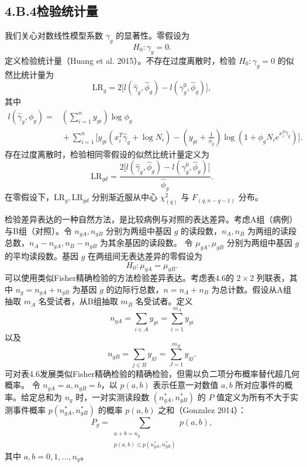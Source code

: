 \subsection*{4.B.4\quad 检验统计量}

我们关心对数线性模型系数 $\gamma_g$ 的显著性。零假设为
\[
H_0:\gamma_g=0.
\]
定义检验统计量（Huang et al. 2015）。不存在过度离散时，检验 $H_0:\gamma_g=0$ 的似然比统计量为
\begin{equation}
\mathrm{LR}_g=2\bigl[l(\widehat\gamma_g,\widehat\phi_g)
-l(\gamma_g^0,\widehat\phi_g)\bigr],\tag{4.B.40}
\end{equation}
其中
\[
\begin{aligned}
l(\widehat\gamma_g,\phi_g)
={}&\left(\sum_{i=1}^{n}y_{gi}\right)\log\phi_g\\
&{}+\sum_{i=1}^{n}\biggl[y_{gi}(x_i^T\widehat\gamma_g+\log N_i)
-\left(y_{gi}+\frac1{\phi_g}\right)
\log(1+\phi_gN_ie^{x_i^T\widehat\gamma_g})\biggr].
\end{aligned}
\]
存在过度离散时，检验相同零假设的似然比统计量定义为
\begin{equation}
\mathrm{LR}_{gd}=\frac{2\bigl[l(\widehat\gamma_g,\widehat\phi_g)
-l(\gamma_g^0,\widehat\phi_g)\bigr]}{\widehat\phi_g}.\tag{4.B.41}
\end{equation}
在零假设下，$\mathrm{LR}_g,\mathrm{LR}_{gd}$ 分别渐近服从中心 $\chi_{(q)}^2$ 与 $F_{(q,n-q-1)}$ 分布。

检验差异表达的一种自然方法，是比较病例与对照的表达差异。考虑A组（病例）与B组（对照）。令 $n_{gA},n_{gB}$ 分别为两组中基因 $g$ 的读段数，$n_A,n_B$ 为两组的读段总数，$n_A-n_{gA},n_B-n_{gB}$ 为其余基因的读段数。
令 $\mu_{gA},\mu_{gB}$ 分别为两组中基因 $g$ 的平均读段数。基因 $g$ 在两组间无表达差异的零假设为
\[
H_0:\mu_{gA}=\mu_{gB}.
\]
可以使用类似Fisher精确检验的方法检验差异表达。考虑表4.6的 $2\times2$ 列联表，其中 $n_g=n_{gA}+n_{gB}$ 为基因 $g$ 的边际行总数，$n=n_A+n_B$ 为总计数。假设从A组抽取 $m_A$ 名受试者，从B组抽取 $m_B$ 名受试者。定义
\begin{equation}
n_{gA}=\sum_{i\in A}y_{gi}=\sum_{i=1}^{m_A}y_{gi}\tag{4.B.42}
\end{equation}
以及
\begin{equation}
n_{gB}=\sum_{j\in B}y_{gj}=\sum_{J=1}^{m_B}y_{gj}.\tag{4.B.43}
\end{equation}
可对表4.6发展类似Fisher精确检验的精确检验，但需以负二项分布概率替代超几何概率。
令 $n_{gA}=a,n_{gB}=b$，以 $p(a,b)$ 表示任意一对数值 $a,b$ 所对应事件的概率。给定总和为 $n_g$ 时，一对实测读段数 $(n_{gA}^*,n_{gB}^*)$ 的 $P$ 值定义为所有不大于实测事件概率 $p(n_{gA}^*,n_{gB}^*)$ 的概率 $p(a,b)$ 之和（Gonzalez 2014）：
\begin{equation}
P_g=\sum_{\substack{a+b=n_g\\p(a,b)\le p(n_{gA}^*,n_{gB}^*)}}p(a,b),\tag{4.B.44}
\end{equation}
其中 $a,b=0,1,\ldots,n_g$。

